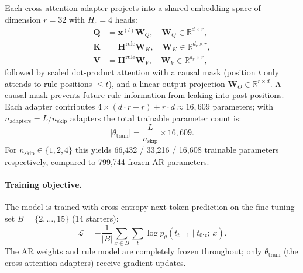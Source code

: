 \documentclass[10pt,twocolumn]{article}
\begin{document}
Each cross-attention adapter projects into a shared embedding space of dimension $r = 32$ with $H_c = 4$ heads:
\begin{align}
  \mathbf{Q} &= \mathbf{x}^{(l)} \mathbf{W}_Q, \quad \mathbf{W}_Q \in \mathbb{R}^{d \times r},\\
  \mathbf{K} &= \mathbf{H}^{\text{rule}} \mathbf{W}_K,\quad \mathbf{W}_K \in \mathbb{R}^{d_r \times r},\\
  \mathbf{V} &= \mathbf{H}^{\text{rule}} \mathbf{W}_V,\quad \mathbf{W}_V \in \mathbb{R}^{d_r \times r},
\end{align}
followed by scaled dot-product attention with a causal mask (position $t$ only attends to rule positions $\leq t$), and a linear output projection $\mathbf{W}_O \in \mathbb{R}^{r \times d}$. A causal mask prevents future rule information from leaking into past positions. Each adapter contributes $4 \times (d \cdot r + r) + r \cdot d \approx 16{,}609$ parameters; with $n_\text{adapters} = L / n_\text{skip}$ adapters the total trainable parameter count is:
\begin{equation}
  |\theta_\text{train}| = \frac{L}{n_\text{skip}} \times 16{,}609.
\end{equation}
For $n_\text{skip} \in \{1, 2, 4\}$ this yields 66,432 / 33,216 / 16,608 trainable parameters respectively, compared to 799,744 frozen AR parameters.

\paragraph{Training objective.}
The model is trained with cross-entropy next-token prediction on the fine-tuning set $B = \{2, \ldots, 15\}$ (14 starters):
\begin{equation}
  \mathcal{L} = -\frac{1}{|B|} \sum_{x \in B} \sum_{t} \log p_\theta\!\left(t_{t+1} \mid t_{0:t};\, x\right).
\end{equation}
The AR weights and rule model are completely frozen throughout; only $\theta_\text{train}$ (the cross-attention adapters) receive gradient updates.
\end{document}
